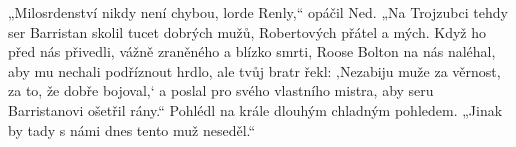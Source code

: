 \documentclass[../ctenarsky-denik.tex]{subfiles}
\begin{document}
\begin{ukazka}
  „Milosrdenství nikdy není chybou, lorde Renly,“ opáčil Ned. „Na Trojzubci tehdy ser Barristan skolil tucet dobrých mužů, Robertových přátel a mých. Když ho před nás přivedli, vážně zraněného a blízko smrti, Roose Bolton na nás naléhal, aby mu nechali podříznout hrdlo, ale tvůj bratr řekl: ‚Nezabiju muže za věrnost, za to, že dobře bojoval,‘ a poslal pro svého vlastního mistra, aby seru Barristanovi ošetřil rány.“ Pohlédl na krále dlouhým chladným pohledem. „Jinak by tady s námi dnes tento muž neseděl.“
\end{ukazka}

\end{document}
